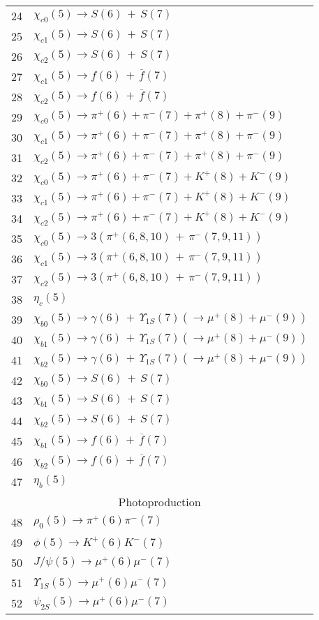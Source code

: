 \documentclass[12pt]{article}
\begin{document}
\begin{center}
\begin{longtable}{|c|l|}
24&$\chi_{c0}(5)\to S(6)\,+\,S(7)$\\
25&$\chi_{c1}(5)\to S(6)\,+\,S(7)$\\
26&$\chi_{c2}(5)\to S(6)\,+\,S(7)$\\
27&$\chi_{c1}(5)\to f(6)\,+\,\overline{f}(7)$\\
28&$\chi_{c2}(5)\to f(6)\,+\,\overline{f}(7)$\\
29&$\chi_{c0}(5)\to \pi^+(6)+\pi^-(7)+\pi^+(8)+\pi^-(9)$\\
30&$\chi_{c1}(5)\to \pi^+(6)+\pi^-(7)+\pi^+(8)+\pi^-(9)$\\
31&$\chi_{c2}(5)\to \pi^+(6)+\pi^-(7)+\pi^+(8)+\pi^-(9)$\\
32&$\chi_{c0}(5)\to \pi^+(6)+\pi^-(7)+K^+(8)+K^-(9)$\\
33&$\chi_{c1}(5)\to \pi^+(6)+\pi^-(7)+K^+(8)+K^-(9)$\\
34&$\chi_{c2}(5)\to \pi^+(6)+\pi^-(7)+K^+(8)+K^-(9)$\\
35&$\chi_{c0}(5)\to 3(\pi^+(6,8,10)\,+\,\pi^-(7,9,11))$\\
36&$\chi_{c1}(5)\to 3(\pi^+(6,8,10)\,+\,\pi^-(7,9,11))$\\
37&$\chi_{c2}(5)\to 3(\pi^+(6,8,10)\,+\,\pi^-(7,9,11))$\\
38& $\eta_c(5)$\\
39&$\chi_{b0}(5)\to \gamma(6)\,+\,\Upsilon_{1S}(7)(\to \mu^+(8)+\mu^-(9))$\\
40&$\chi_{b1}(5)\to \gamma(6)\,+\,\Upsilon_{1S}(7)(\to \mu^+(8)+\mu^-(9))$\\
41&$\chi_{b2}(5)\to \gamma(6)\,+\,\Upsilon_{1S}(7)(\to \mu^+(8)+\mu^-(9))$\\
42&$\chi_{b0}(5)\to S(6)\,+\,S(7)$\\
43&$\chi_{b1}(5)\to S(6)\,+\,S(7)$\\
44&$\chi_{b2}(5)\to S(6)\,+\,S(7)$\\
45&$\chi_{b1}(5)\to f(6)\,+\,\overline{f}(7)$\\
46&$\chi_{b2}(5)\to f(6)\,+\,\overline{f}(7)$\\
47& $\eta_b(5)$\\
\hline\hline
\multicolumn{2}{|c|}{Photoproduction}\\
\hline\hline
48&$\rho_0(5)\to \pi^+(6)\pi^-(7)$\\
49&$\phi(5)\to K^+(6)K^-(7)$\\
50&$J/\psi(5)\to \mu^+(6)\mu^-(7)$\\
51&$\Upsilon_{1S}(5)\to \mu^+(6)\mu^-(7)$\\
52&$\psi_{2S}(5)\to \mu^+(6)\mu^-(7)$\\

\end{longtable}
\end{center}
\end{document}
